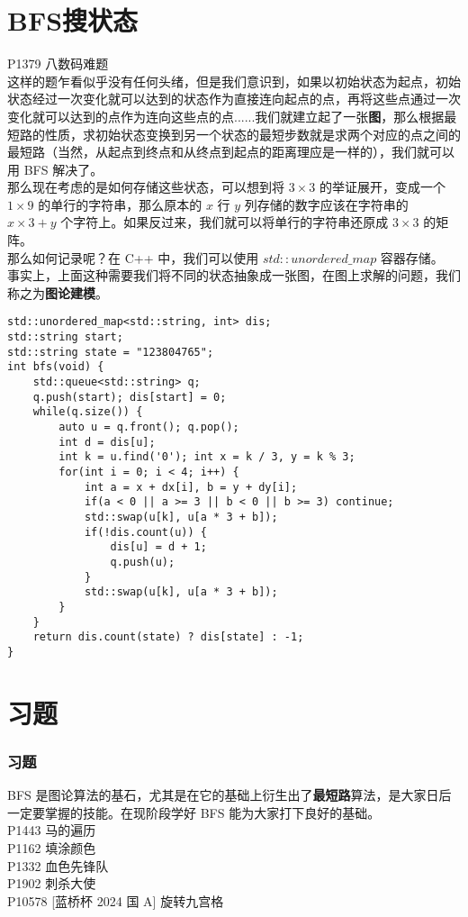 \documentclass{beamer}
\newcommand{\fdf}[1]{\alert{\textbf{#1}}}
\begin{document}
\section{BFS搜状态}
\begin{frame}
P1379 八数码难题\\ 
这样的题乍看似乎没有任何头绪，但是我们意识到，如果以初始状态为起点，初始状态经过一次变化就可以达到的状态作为直接连向起点的点，再将这些点通过一次变化就可以达到的点作为连向这些点的点......我们就建立起了一张\fdf{图}，那么根据最短路的性质，求初始状态变换到另一个状态的最短步数就是求两个对应的点之间的最短路（当然，从起点到终点和从终点到起点的距离理应是一样的），我们就可以用 BFS 解决了。\\ 
那么现在考虑的是如何存储这些状态，可以想到将 $3 \times 3$ 的举证展开，变成一个	$1 \times 9$ 的单行的字符串，那么原本的 $x$ 行 $y$ 列存储的数字应该在字符串的 $x \times 3 + y$ 个字符上。如果反过来，我们就可以将单行的字符串还原成 $3 \times 3$ 的矩阵。	\\ 
那么如何记录呢？在 C++ 中，我们可以使用 $std::unordered\_map$ 容器存储。\\ 
事实上，上面这种需要我们将不同的状态抽象成一张图，在图上求解的问题，我们称之为\fdf{图论建模}。
\end{frame}
\begin{frame}[fragile]
\begin{onlyenv}
\begin{verbatim}
std::unordered_map<std::string, int> dis;
std::string start;
std::string state = "123804765";
int bfs(void) {
    std::queue<std::string> q;
    q.push(start); dis[start] = 0;
    while(q.size()) {
        auto u = q.front(); q.pop();
        int d = dis[u];
        int k = u.find('0'); int x = k / 3, y = k % 3;
        for(int i = 0; i < 4; i++) {
            int a = x + dx[i], b = y + dy[i];
            if(a < 0 || a >= 3 || b < 0 || b >= 3) continue;
            std::swap(u[k], u[a * 3 + b]);
            if(!dis.count(u)) {
                dis[u] = d + 1;
                q.push(u);
            }
            std::swap(u[k], u[a * 3 + b]);
        }
    }
    return dis.count(state) ? dis[state] : -1;
}
\end{verbatim}
\end{onlyenv}
\end{frame}
\section{习题}
\begin{frame}
\frametitle{习题}
BFS 是图论算法的基石，尤其是在它的基础上衍生出了\fdf{最短路}算法，是大家日后一定要掌握的技能。在现阶段学好 BFS 能为大家打下良好的基础。\\ 
P1443	马的遍历\\ 
P1162 填涂颜色 \\
P1332 血色先锋队\\ 
P1902 刺杀大使\\
P10578 [蓝桥杯 2024 国 A] 旋转九宫格 \\
\end{frame}
\end{document}
